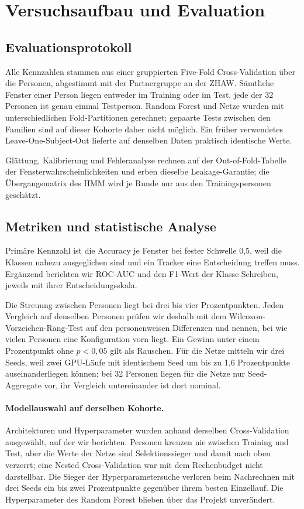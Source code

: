 \section{Versuchsaufbau und Evaluation}
\label{sec:experimental-setup}

\subsection{Evaluationsprotokoll}
\label{sec:cv}

Alle Kennzahlen stammen aus einer gruppierten Five-Fold Cross-Validation über
die Personen, abgestimmt mit der Partnergruppe an der ZHAW. Sämtliche Fenster
einer Person liegen entweder im Training oder im Test, jede der 32 Personen
ist genau einmal Testperson. Random Forest und Netze wurden mit
unterschiedlichen Fold-Partitionen gerechnet; gepaarte Tests zwischen den
Familien sind auf dieser Kohorte daher nicht möglich. Ein früher verwendetes
Leave-One-Subject-Out lieferte auf denselben Daten praktisch identische
Werte.

Glättung, Kalibrierung und Fehleranalyse rechnen auf der Out-of-Fold-Tabelle
der Fensterwahrscheinlichkeiten und erben dieselbe Leakage-Garantie; die
Übergangsmatrix des HMM wird je Runde nur aus den Trainingspersonen
geschätzt.

\subsection{Metriken und statistische Analyse}
\label{sec:metrics}

Primäre Kennzahl ist die Accuracy je Fenster bei fester Schwelle 0,5, weil
die Klassen nahezu ausgeglichen sind und ein Tracker eine Entscheidung
treffen muss. Ergänzend berichten wir ROC-AUC und den F1-Wert der Klasse
Schreiben, jeweils mit ihrer Entscheidungsskala.

Die Streuung zwischen Personen liegt bei drei bis vier Prozentpunkten.
Jeden Vergleich auf denselben Personen prüfen wir deshalb mit dem
Wilcoxon-Vorzeichen-Rang-Test \citep{wilcoxon1945} auf den personenweisen
Differenzen und nennen, bei wie vielen Personen eine Konfiguration vorn
liegt. Ein Gewinn unter einem Prozentpunkt ohne $p < 0{,}05$ gilt als
Rauschen. Für die Netze mitteln wir drei Seeds, weil zwei GPU-Läufe mit
identischem Seed um bis zu 1,6 Prozentpunkte auseinanderliegen können; bei
32 Personen liegen für die Netze nur Seed-Aggregate vor, ihr Vergleich
untereinander ist dort nominal.

\paragraph{Modellauswahl auf derselben Kohorte.} Architekturen und
Hyperparameter wurden anhand derselben Cross-Validation ausgewählt, auf der
wir berichten. Personen kreuzen nie zwischen Training und Test, aber die Werte der Netze
sind Selektionssieger und damit nach oben verzerrt; eine Nested
Cross-Validation war mit dem Rechenbudget nicht darstellbar. Die Sieger der
Hyperparametersuche verloren beim Nachrechnen mit drei Seeds ein bis zwei
Prozentpunkte gegenüber ihrem besten Einzellauf. Die Hyperparameter des
Random Forest blieben über das Projekt unverändert.

